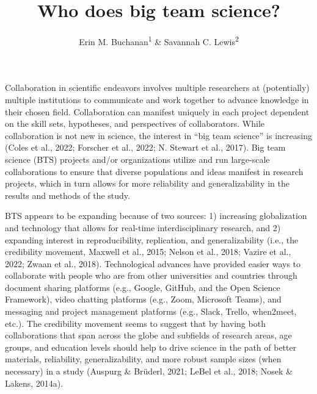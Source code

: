 \documentclass[
  man,mask,floatsintext]{apa7}
\title{Who does big team science?}
\author{Erin M. Buchanan\textsuperscript{1} \& Savannah C. Lewis\textsuperscript{2}}
\date{}
\affiliation{\vspace{0.5cm}\textsuperscript{1} Harrisburg University of Science and Technology\\\textsuperscript{2} University of Alabama}
\begin{document}
\maketitle

Collaboration in scientific endeavors involves multiple researchers at
(potentially) multiple institutions to communicate and work together to
advance knowledge in their chosen field. Collaboration can manifest
uniquely in each project dependent on the skill sets, hypotheses, and
perspectives of collaborators. While collaboration is not new in
science, the interest in ``big team science'' is increasing
(Coles et al., 2022; Forscher et al., 2022; N. Stewart et al., 2017). Big team science (BTS) projects
and/or organizations utilize and run large-scale collaborations to
ensure that diverse populations and ideas manifest in research
projects, which in turn allows for more reliability and generalizability
in the results and methods of the study.

BTS appears to be expanding because of two sources: 1) increasing
globalization and technology that allows for real-time interdisciplinary
research, and 2) expanding interest in reproducibility, replication, and
generalizability (i.e., the credibility movement, Maxwell et al., 2015; Nelson et al., 2018; Vazire et al., 2022; Zwaan et al., 2018). Technological
advances have provided easier ways to collaborate with people who are
from other universities and countries through document sharing platforms
(e.g., Google, GitHub, and the Open Science Framework), video chatting
platforms (e.g., Zoom, Microsoft Teams), and messaging and project
management platforms (e.g., Slack, Trello, when2meet, etc.). The
credibility movement seems to suggest that by having both collaborations
that span across the globe and subfields of research areas, age groups,
and education levels should help to drive science in the path of better
materials, reliability, generalizability, and more robust sample sizes
(when necessary) in a study (Auspurg \& Brüderl, 2021; LeBel et al., 2018; Nosek \& Lakens, 2014a).
\end{document}
